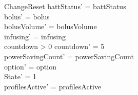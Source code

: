\begin{schema}{ChangeReset}
	battStatus' = battStatus\\
	bolus' = bolus\\
	bolusVolume' = bolusVolume\\
	infusing' = infusing\\
	countdown > 0 \land countdown' = 5\\
	powerSavingCount' = powerSavingCount\\ 
	option' = option\\
	State' = 1\\
	profilesActive' = profilesActive
\end{schema}

